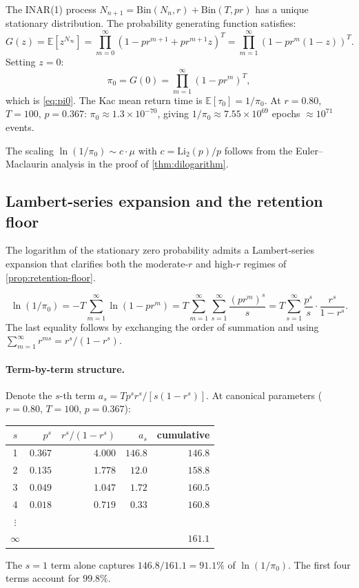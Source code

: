 \documentclass[11pt]{article}
\theoremstyle{plain}
\theoremstyle{definition}
\theoremstyle{remark}
\begin{document}
The INAR(1) process $N_{n+1} = \mathrm{Bin}(N_n, r) + \mathrm{Bin}(T,
pr)$ has a unique stationary distribution.  The probability generating
function satisfies:
\[
  G(z) = \mathbb{E}[z^{N_\infty}]
  = \prod_{m=0}^{\infty} (1 - pr^{m+1} + pr^{m+1} z)^T
  = \prod_{m=1}^{\infty} (1 - pr^m(1-z))^T.
\]
Setting $z = 0$:
\[
  \pi_0 = G(0) = \prod_{m=1}^{\infty} (1 - pr^m)^T,
\]
which is \cref{eq:pi0}.  The Kac mean return time is
$\mathbb{E}[\tau_0] = 1/\pi_0$.  At $r = 0.80$, $T = 100$,
$p = 0.367$: $\pi_0 \approx 1.3 \times 10^{-70}$, giving
$1/\pi_0 \approx 7.55 \times 10^{69}$ epochs $\approx 10^{71}$ events.

The scaling $\ln(1/\pi_0) \sim c \cdot \mu$ with
$c = \mathrm{Li}_2(p)/p$ follows from the Euler--Maclaurin analysis in
the proof of \cref{thm:dilogarithm}.

\subsection*{Lambert-series expansion and the retention floor}

The logarithm of the stationary zero probability admits a Lambert-series
expansion that clarifies both the moderate-$r$ and high-$r$ regimes of
\cref{prop:retention-floor}.

\begin{equation}\label{eq:lambert}
  \ln(1/\pi_0)
  = -T \sum_{m=1}^{\infty} \ln(1 - pr^m)
  = T \sum_{m=1}^{\infty} \sum_{s=1}^{\infty} \frac{(pr^m)^s}{s}
  = T \sum_{s=1}^{\infty} \frac{p^s}{s} \cdot \frac{r^s}{1 - r^s}.
\end{equation}
The last equality follows by exchanging the order of summation and
using $\sum_{m=1}^\infty r^{ms} = r^s/(1-r^s)$.

\paragraph{Term-by-term structure.}
Denote the $s$-th term $a_s = Tp^s r^s / [s(1-r^s)]$.  At canonical
parameters ($r = 0.80$, $T = 100$, $p = 0.367$):
\begin{center}
\begin{tabular}{@{}crrrr@{}}
\toprule
$s$ & $p^s$ & $r^s/(1-r^s)$ & $a_s$ & cumulative \\
\midrule
1 & $0.367$ & $4.000$ & $146.8$ & $146.8$ \\
2 & $0.135$ & $1.778$ & $12.0$ & $158.8$ \\
3 & $0.049$ & $1.047$ & $1.72$ & $160.5$ \\
4 & $0.018$ & $0.719$ & $0.33$ & $160.8$ \\
$\vdots$ & & & & \\
$\infty$ & & & & $161.1$ \\
\bottomrule
\end{tabular}
\end{center}
The $s = 1$ term alone captures $146.8/161.1 = 91.1\%$ of
$\ln(1/\pi_0)$.  The first four terms account for $99.8\%$.
\end{document}
